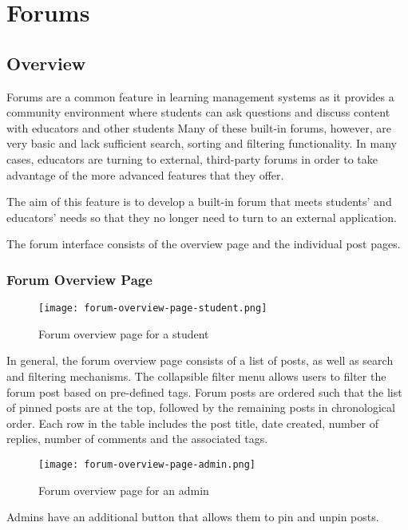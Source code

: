 \section{Forums}
\subsection{Overview}
Forums are a common feature in learning management systems as it provides a community environment where students can ask questions and discuss content with educators and other students
Many of these built-in forums, however, are very basic and lack sufficient search, sorting and filtering functionality.
In many cases, educators are turning to external, third-party forums in order to take advantage of the more advanced features that they offer.

The aim of this feature is to develop a built-in forum that meets students' and educators' needs so that they no longer need to turn to an external application.

The forum interface consists of the overview page and the individual post pages.

\newpage

\subsubsection{Forum Overview Page}

\begin{figure}[h!]
    \texttt{[image: forum-overview-page-student.png]}
    \centering
    \caption{Forum overview page for a student}
\end{figure}

In general, the forum overview page consists of a list of posts, as well as search and filtering mechanisms.
The collapsible filter menu allows users to filter the forum post based on pre-defined tags.
Forum posts are ordered such that the list of pinned posts are at the top, followed by the remaining posts in chronological order.
Each row in the table includes the post title, date created, number of replies, number of comments and the associated tags.

\begin{figure}[h!]
    \texttt{[image: forum-overview-page-admin.png]}
    \centering
    \caption{Forum overview page for an admin}
\end{figure}

Admins have an additional button that allows them to pin and unpin posts.

